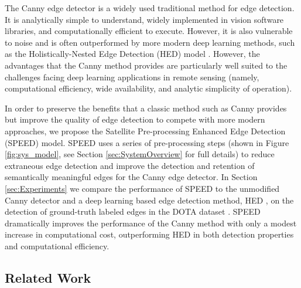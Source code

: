\documentclass[conference]{IEEEtran}
\begin{document}
The Canny edge detector \cite{Canny1986} is a widely used traditional method for edge detection. It is analytically simple to understand, widely implemented in vision software libraries, and computationally efficient to execute. However, it is also vulnerable to noise and is often outperformed by more modern deep learning methods, such as the Holistically-Nested Edge Detection (HED) model \cite{XieTu2015}. However, the advantages that the Canny method provides are particularly well suited to the challenges facing deep learning applications in remote sensing (namely, computational efficiency, wide availability, and analytic simplicity of operation). 

In order to preserve the benefits that a classic method such as Canny provides but improve the quality of edge detection to compete with more modern approaches, we propose the Satellite Pre-processing Enhanced Edge Detection (SPEED) model. SPEED uses a series of pre-processing steps (shown in Figure \ref{fig:sys_model}, see Section \ref{sec:SystemOverview} for full details) to reduce extraneous edge detection and improve the detection and retention of semantically meaningful edges for the Canny edge detector. In Section \ref{sec:Experiments} we compare the performance of SPEED to the unmodified Canny detector and a deep learning based edge detection method, HED \cite{XieTu2015}, on the detection of ground-truth labeled edges in the DOTA dataset \cite{XiaEtAl2018}. SPEED dramatically improves the performance of the Canny method with only a modest increase in computational cost, outperforming HED in both detection properties and computational efficiency.

\subsection{Related Work}

\end{document}
